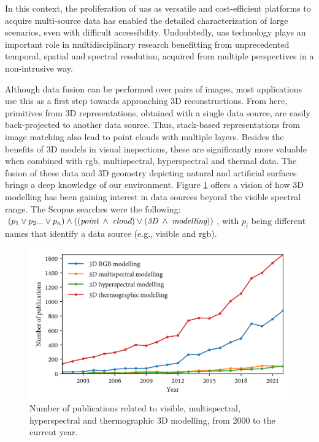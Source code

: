 In this context, the proliferation of \acrshort{uas} as versatile and cost-efficient platforms to acquire multi-source data has enabled the detailed characterization of large scenarios, even with difficult accessibility. Undoubtedly, \acrshort{uas} technology plays an important role in multidisciplinary research benefitting from unprecedented temporal, spatial and spectral resolution, acquired from multiple perspectives in a non-intrusive way.

Although data fusion can be performed over pairs of images, most applications use this as a first step towards approaching 3D reconstructions. From here, primitives from 3D representations, obtained with a single data source, are easily back-projected to another data source. Thus, stack-based representations from image matching also lead to point clouds with multiple layers. Besides the benefits of 3D models in visual inspections, these are significantly more valuable when combined with \acrshort{rgb}, multispectral, hyperspectral and thermal data. The fusion of these data and 3D geometry depicting natural and artificial surfaces brings a deep knowledge of our environment. Figure \ref{fig:scopus_point_clouds} offers a vision of how 3D modelling has been gaining interest in data sources beyond the visible spectral range. The Scopus searches were the following: $(p_1 \lor p_2 ... \lor p_n) \land ((\textit{point} \hspace{1mm} \land \hspace{1mm} \textit{cloud}) \lor (\textit{3D} \hspace{1mm} \land \hspace{1mm} \textit{modelling}))$, with $p_i$ being different names that identify a data source (e.g., visible and \acrshort{rgb}).

\begin{figure}[ht]
    \centering
    \includegraphics[width=\linewidth]{figs/context/3d_modelling.png}
	\caption{Number of publications related to visible, multispectral, hyperspectral and thermographic 3D modelling, from 2000 to the current year. }
	\label{fig:scopus_point_clouds}
\end{figure}

